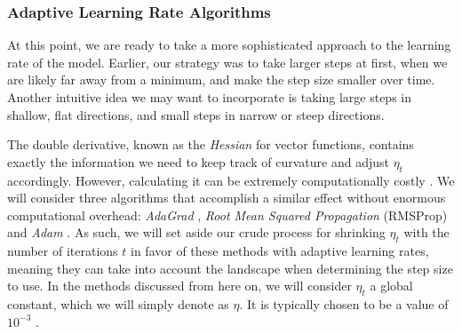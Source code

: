\subsubsection{Adaptive Learning Rate Algorithms}
At this point, we are ready to take a more sophisticated approach to the learning rate of the model. Earlier, our strategy was to take larger steps at first, when we are likely far away from a minimum, and make the step size smaller over time. 
Another intuitive idea we may want to incorporate is taking large steps in shallow, flat directions, and small steps in narrow or steep directions. 

The double derivative, known as the \emph{Hessian} for vector functions, contains exactly the information we need to keep track of curvature and adjust $\eta_t$ accordingly. However, calculating it can be extremely computationally costly \cite{MHJweek39}. We will consider three algorithms that accomplish a similar effect without enormous computational overhead: \emph{AdaGrad} \cite{deeplearningbookChapter8}, \emph{Root Mean Squared Propagation} (RMSProp) \cite{deeplearningbookChapter8} and \emph{Adam} \cite{Kingma2014AdamAM}. As such, we will set aside our crude process for shrinking $\eta_t$ with the number of iterations $t$ in favor of these methods with adaptive learning rates, meaning they can take into account the landscape when determining the step size to use. In the methods discussed from here on, we will consider $\eta_t$ a global constant, which we will simply denote as $\eta$. It is typically chosen to be a value of $10^{-3}$ \cite{MHJweek39}.

